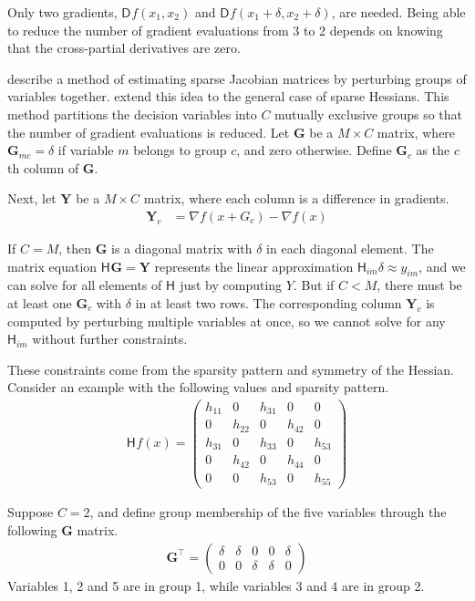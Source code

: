 \documentclass[article]{jss}\usepackage[]{graphicx}\usepackage[]{color}
\newcommand{\parD}[3]{\mathsf{D}^{#1}_{#2}#3}
\newcommand{\hess}[2]{\mathsf{H}_{#1}#2}
\newcommand{\Mat}[1]{\mathbf{#1}}
\begin{document}
Only two gradients,
${\parD{}{}{f(x_1,x_2)}}$ and ${\parD{}{}{f(x_1+\delta,x_2+\delta)}}$,
are needed.
Being able to reduce the number of gradient evaluations from 3 to 2 depends on knowing that
the cross-partial derivatives are zero.

 describe a method of estimating sparse
Jacobian matrices by perturbing groups of variables together.
 extend this idea to the
general case of sparse Hessians.  This method partitions
the decision variables into $C$ mutually exclusive groups so that the number of gradient
evaluations is reduced.  Let $\Mat{G}$ be a $M\times C$
matrix, where $\Mat{G}_{mc}=\delta$ if variable $m$ belongs to group $c$, and zero
otherwise.  Define $\Mat{G}_c$ as the $c$th column of $\Mat{G}$.

Next, let $\Mat{Y}$ be a $M\times C$ matrix, where each column is a
difference in gradients.
\begin{align}
  \label{eq:Yg}
  \Mat{Y}_c&=\nabla f(x+G_c)-\nabla f(x)
\end{align}

If $C=M$, then $\Mat{G}$ is a diagonal matrix with $\delta$ in each
diagonal element.  The matrix equation $\hess{}{}\Mat{G}=\Mat{Y}$ represents the linear approximation
$\hess{im}{}\delta\approx y_{im}$, and we can solve for all elements of $\hess{}{}$
just by computing $Y$. But if $C<M$,
there must be at least one $\Mat{G}_c$ with $\delta$ in at least two
rows. The corresponding column $\Mat{Y}_c$ is computed by perturbing multiple variables at
once, so we cannot solve for any $\hess{im}{}$
without further constraints.

These constraints come from the sparsity pattern and symmetry
of the Hessian. Consider an example with the following values and
sparsity pattern.
\begin{align}
  \label{eq:7}
 \hess{}{f(x)}= \begin{pmatrix}
    h_{11}&0&h_{31}&0&0\\
    0&h_{22}&0&h_{42}&0\\
    h_{31}&0&h_{33}&0&h_{53}\\
    0&h_{42}&0&h_{44}&0\\
    0&0&h_{53}&0&h_{55}
  \end{pmatrix}
\end{align}

Suppose $C=2$, and define group membership of the five variables through the following $\Mat{G}$ matrix.
\begin{align}
  \label{eq:7}
 \Mat{G}^\top= \begin{pmatrix}
 \delta&\delta&0&0&\delta\\
 0&0&\delta&\delta&0
 \end{pmatrix}
\end{align}
Variables 1, 2 and 5 are in group 1, while variables 3 and 4 are in
group 2.
\end{document}
